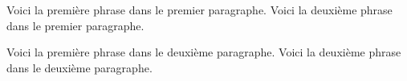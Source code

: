 \documentclass{article}
\begin{document}
\setlength{\parindent}{10pt}
Voici la première phrase dans le premier paragraphe.
Voici la deuxième phrase dans le premier paragraphe.

\noindent
Voici la première phrase dans le deuxième paragraphe.
Voici la deuxième phrase dans le deuxième paragraphe.
\end{document}
